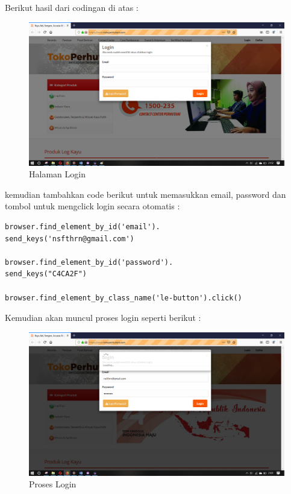 Berikut hasil dari codingan di atas :
\begin{figure}[h]
	\centering
	\includegraphics[scale=0.28]{figures/0login}
	\caption{Halaman Login}
\end{figure}

kemudian tambahkan code berikut untuk memasukkan email, password dan tombol untuk mengclick login secara otomatis : 
\begin{verbatim}
browser.find_element_by_id('email').
send_keys('nsfthrn@gmail.com')

browser.find_element_by_id('password').
send_keys("C4CA2F")

browser.find_element_by_class_name('le-button').click() 
\end{verbatim}
\newpage
Kemudian akan muncul proses login seperti berikut :
\begin{figure}[h]
	\centering
	\includegraphics[scale=0.25]{figures/1login}
	\caption{Proses Login}
\end{figure}

